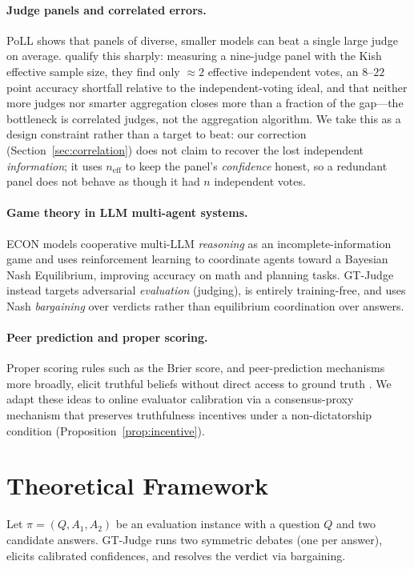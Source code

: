 \documentclass[11pt]{article}
\newcommand{\neff}{n_{\mathrm{eff}}}
\begin{document}
\paragraph{Judge panels and correlated errors.} PoLL \citep{verga2024} shows
that panels of diverse, smaller models can beat a single large judge on
average. \citet{kohli2026} qualify this sharply: measuring a nine-judge panel
with the Kish effective sample size, they find only $\approx 2$ effective
independent votes, an $8$--$22$ point accuracy shortfall relative to the
independent-voting ideal, and that neither more judges nor smarter aggregation
closes more than a fraction of the gap---the bottleneck is correlated judges,
not the aggregation algorithm. We take this as a design constraint rather than
a target to beat: our correction (Section~\ref{sec:correlation}) does not claim
to recover the lost independent \emph{information}; it uses $\neff$ to keep the
panel's \emph{confidence} honest, so a redundant panel does not behave as though
it had $n$ independent votes.

\paragraph{Game theory in LLM multi-agent systems.} ECON \citep{xie2025} models
cooperative multi-LLM \emph{reasoning} as an incomplete-information game and
uses reinforcement learning to coordinate agents toward a Bayesian Nash
Equilibrium, improving accuracy on math and planning tasks. GT-Judge instead
targets adversarial \emph{evaluation} (judging), is entirely training-free, and
uses Nash \emph{bargaining} over verdicts rather than equilibrium coordination
over answers.

\paragraph{Peer prediction and proper scoring.} Proper scoring rules such as
the Brier score, and peer-prediction mechanisms more broadly, elicit truthful
beliefs without direct access to ground truth \citep{prelec2004}. We adapt
these ideas to online evaluator calibration via a consensus-proxy mechanism
that preserves truthfulness incentives under a non-dictatorship condition
(Proposition~\ref{prop:incentive}).

\section{Theoretical Framework}
Let $\pi = (Q, A_1, A_2)$ be an evaluation instance with a question $Q$ and two
candidate answers. GT-Judge runs two symmetric debates (one per answer),
elicits calibrated confidences, and resolves the verdict via bargaining.
\end{document}
